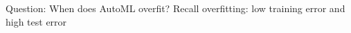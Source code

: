 \begin{frame}{Question: When does AutoML overfit?}
Recall overfitting: low training error and high test error
\end{frame}
